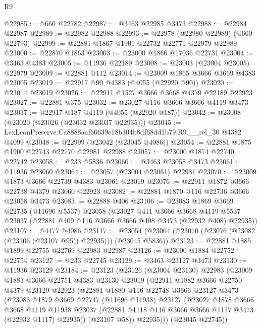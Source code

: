 \begin{lexlean}{R9}
\begin{coremodule}
@22985 := @660 @22782
@22987 := @3463 @22985 @3473
@22988 := @22984 @22987
@22989 := @22982 @22988
@22993 := @22978 (@22980 @22989) (@660 @22793)
@22999 := @22881 @1867 @1901 @22732 @22771 @22979 @22989
@23000 := @22870 @1863
@23003 := @23000 @1866 @17036 @22731
@23004 := @3463 @4383
@23005 := @11936 @22189
@23008 := @23003 (@23004 @23005) @22979
@23009 := @22881 @112
@23014 := @23009 @1865 @3666 @3669 @4383 @23005
@23019 := @22917 @90 @4383 (@4055 (@22920 @90))
@23020 := @23014 @23019
@23026 := @22911 @1527 @3666 @3668 @4379 @22189 @22923
@23027 := @22881 @375
@23032 := @23027 @116 @3666 @3666 @4119 @3473
@23037 := @22917 @187 @4119 (@4055 (@22920 @187))
@23042 := @23008 (@23020 (@23026 (@23032 @23037 @22935)))
@23045 := LexLeanPreserve.Ca8888aaf66639e18b304b8df68dd1b79.R9.__rel_30 @4382 @4099
@23048 := @22999 (@23042 (@23045 @4086))
@23054 := @22881 @1875 @1900 @22743 @22770 @22981 @22988
@23057 := @23000 @1874 @22740 @22742
@23058 := @233 @5836
@23060 := @3463 @23058 @3473
@23061 := @11936 @23060
@23064 := @23057 (@23004 @23061) @22981
@23070 := @23009 @1873 @3666 @22739 @4383 @23061 @23019
@23076 := @22911 @1872 @3666 @22738 @4379 @23060 @22923
@23082 := @22881 @1870 @116 @22736 @3666 @23058 @3473
@23083 := @22888 @406
@23106 := @23083
    @1869
    @3669
    @22735
    (@11696 @5537)
    @23058
    (@23027
      @411
      @3666
      @3668
      @4119
      @5537
      @23037
      (@22881 @409 @116 @3666 @3666 @408 @3473 (@22932 @408) @22935))
@23107 := @4477 @4086
@23117 := @23054 (@23064 (@23070 (@23076 (@23082 (@23106 (@23107 @95)) @22935))) (@23045 @5836))
@23123 := @22881 @1885 @1899 @22755 @22769 @22983 @22987
@23126 := @23000 @1884 @22752 @22754
@23127 := @233 @22745
@23129 := @3463 @23127 @3473
@23130 := @11936 @23129
@23184 := @23123
    (@23126
      (@23004 @23130)
      @22983
      (@23009
        @1883
        @3666
        @22751
        @4383
        @23130
        @23019
        (@22911
          @1882
          @3666
          @22750
          @4379
          @23129
          @22923
          (@22881
            @1880
            @116
            @22748
            @3666
            @23127
            @3473
            (@23083
              @1879
              @3669
              @22747
              (@11696 @11938)
              @23127
              (@23027
                @1878
                @3666
                @3668
                @4119
                @11938
                @23037
                (@22881 @1118 @116 @3666 @3666 @1117 @3473 (@22932 @1117) @22935))
              (@23107 @58))
            @22935)))
      (@23045 @22745))

\end{coremodule}
\end{lexlean}
